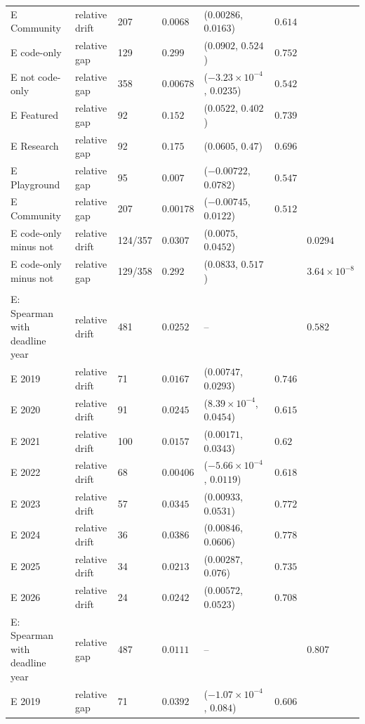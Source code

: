 {\begin{longtable}{>{\raggedright\arraybackslash}p{4.1cm}>{\raggedright\arraybackslash}p{1.9cm}p{1.1cm}p{1.9cm}p{3.5cm}p{0.9cm}p{1.6cm}}
E Community & relative drift & 207 & $0.0068$ & ($0.00286$, $0.0163$) & $0.614$ &  \\
E code-only & relative gap & 129 & $0.299$ & ($0.0902$, $0.524$) & $0.752$ &  \\
E not code-only & relative gap & 358 & $0.00678$ & ($-3.23\times10^{-4}$, $0.0235$) & $0.542$ &  \\
E Featured & relative gap & 92 & $0.152$ & ($0.0522$, $0.402$) & $0.739$ &  \\
E Research & relative gap & 92 & $0.175$ & ($0.0605$, $0.47$) & $0.696$ &  \\
E Playground & relative gap & 95 & $0.007$ & ($-0.00722$, $0.0782$) & $0.547$ &  \\
E Community & relative gap & 207 & $0.00178$ & ($-0.00745$, $0.0122$) & $0.512$ &  \\
E code-only minus not & relative drift & 124/357 & $0.0307$ & ($0.0075$, $0.0452$) &  & $0.0294$ \\
E code-only minus not & relative gap & 129/358 & $0.292$ & ($0.0833$, $0.517$) &  & $3.64\times10^{-8}$ \\
\midrule
\multicolumn{7}{l}{\textbf{S4}} \\
E: Spearman with deadline year & relative drift & 481 & $0.0252$ & -- &  & $0.582$ \\
E 2019 & relative drift & 71 & $0.0167$ & ($0.00747$, $0.0293$) & $0.746$ &  \\
E 2020 & relative drift & 91 & $0.0245$ & ($8.39\times10^{-4}$, $0.0454$) & $0.615$ &  \\
E 2021 & relative drift & 100 & $0.0157$ & ($0.00171$, $0.0343$) & $0.62$ &  \\
E 2022 & relative drift & 68 & $0.00406$ & ($-5.66\times10^{-4}$, $0.0119$) & $0.618$ &  \\
E 2023 & relative drift & 57 & $0.0345$ & ($0.00933$, $0.0531$) & $0.772$ &  \\
E 2024 & relative drift & 36 & $0.0386$ & ($0.00846$, $0.0606$) & $0.778$ &  \\
E 2025 & relative drift & 34 & $0.0213$ & ($0.00287$, $0.076$) & $0.735$ &  \\
E 2026 & relative drift & 24 & $0.0242$ & ($0.00572$, $0.0523$) & $0.708$ &  \\
E: Spearman with deadline year & relative gap & 487 & $0.0111$ & -- &  & $0.807$ \\
E 2019 & relative gap & 71 & $0.0392$ & ($-1.07\times10^{-4}$, $0.084$) & $0.606$ &  \\

\end{longtable}}
